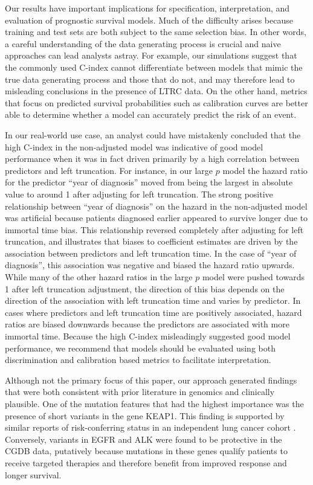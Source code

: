 \documentclass[11pt,final,fleqn]{article}\usepackage[]{graphicx}\usepackage[]{color}
\theoremstyle{plain}
\begin{document}
Our results have important implications for specification, interpretation, and evaluation of prognostic survival models. Much of the difficulty arises because training and test sets are both subject to the same selection bias. In other words, a careful understanding of the data generating process is crucial and naive approaches can lead analysts astray. For example, our simulations suggest that the commonly used C-index cannot differentiate between models that mimic the true data generating process and those that do not, and may therefore lead to misleading conclusions in the presence of LTRC data. On the other hand, metrics that focus on predicted survival probabilities such as calibration curves are better able to determine whether a model can accurately predict the risk of an event.  

In our real-world use case, an analyst could have mistakenly concluded that the high C-index in the non-adjusted model was indicative of good model performance when it was in fact driven primarily by a high correlation between predictors and left truncation. For instance, in our large $p$ model the hazard ratio for the predictor ``year of diagnosis'' moved from being the largest in absolute value to around 1 after adjusting for left truncation. The strong positive relationship between ``year of diagnosis'' on the hazard in the non-adjusted model was artificial because patients diagnosed earlier appeared to survive longer due to immortal time bias. This relationship reversed completely after adjusting for left truncation, and illustrates that biases to coefficient estimates are driven by the association between predictors and left truncation time. In the case of ``year of diagnosis'', this association was negative and biased the hazard ratio upwards. While many of the other hazard ratios in the large $p$ model were pushed towards 1 after left truncation adjustment, the direction of this bias depends on the direction of the association with left truncation time and varies by predictor. In cases where predictors and left truncation time are positively associated, hazard ratios are biased downwards because the predictors are associated with more immortal time. Because the high C-index misleadingly suggested good model performance, we recommend that models should be evaluated using both discrimination and calibration based metrics to facilitate interpretation.

Although not the primary focus of this paper, our approach generated findings that were both consistent with prior literature in genomics and clinically plausible. One of the mutation features that had the highest importance was the presence of short variants in the gene KEAP1. This finding is supported by similar reports of risk-conferring status in an independent lung cancer cohort \cite{shen_harnessing_2019}. Conversely, variants in EGFR and ALK were found to be protective in the CGDB data, putatively because mutations in these genes qualify patients to receive targeted therapies and therefore benefit from improved response and longer survival.
\end{document}
